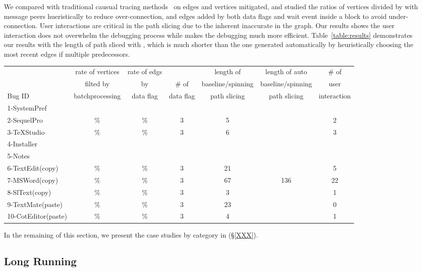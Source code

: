 We compared \xxx with traditional causual tracing methods~\cite{XXXX} on edges
and vertices \xxx mitigated, and studied the ratios of vertices divided by
with message peers hueristically to reduce over-connection, and edges added
by both data flags and wait event inside a block to avoid under-connection.
User interactions are critical in the path slicing due to the inherent
inaccurate in the graph. Our results shows the user interaction does not
overwhelm the debugging process while makes the debugging much more efficient.
Table~\ref{table:results} demonstrates our results with the length of path
sliced with \xxx, which is much shorter than the one generated automatically by
heuristically choosing the most recent edges if multiple predecessors.


\begin{table*}[ht]
\footnotesize
\centering
  \begin{tabularx}{\textwidth}{l|cccccc}
 	   & rate of vertices   & rate of edgs&           & length of \xxx      & length of auto      & \# of\\
       & filted by          & by          & \# of     & baseline/spinning   & baseline/spinning   &user\\
Bug ID & batchprocessing    & data flag   & data flag & path slicing        & path slicing        &interaction \\
\hline
\hline
 1-SystemPref&&&&&&\\
 2-SequelPro & \% & \% & 3 & 5 &  & 2  \\
 3-TeXStudio & \% & \% & 3 & 6 &  & 3 \\
 4-Installer &&&&&& \\
 5-Notes &&&&&& \\
 6-TextEdit(copy)&\% &\% & 3 & 21 & & 5\\
 7-MSWord(copy)&\%&\%& 3 & 67 & 136 & 22\\
 8-SlText(copy)&\%&\%&3 & 3 & & 1\\
 9-TextMate(paste) & \%&\% &3 & 23& & 0\\
 10-CotEditor(paste) & \%& \%& 3 & 4 & & 1\\
\hline
  \end{tabularx}
  \caption{Graph Comparison}
  \label{table:results}
\end{table*}

In the remaining of this section, we present the case studies by category in (\S\ref{XXX}). 

\subsection{Long Running}

